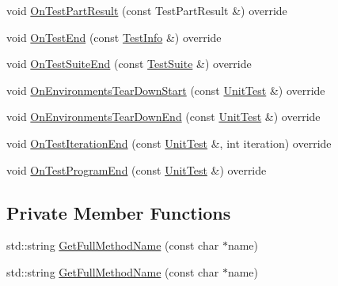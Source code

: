 \begin{DoxyCompactItemize}
\item 
void \mbox{\hyperlink{classtesting_1_1internal_1_1_event_recording_listener2_a0c7bd2ef9f0e467b408dcb4c984cb3fc}{On\+Test\+Part\+Result}} (const Test\+Part\+Result \&) override
\item 
void \mbox{\hyperlink{classtesting_1_1internal_1_1_event_recording_listener2_a8651cee935f60407bd65d0162a6d9629}{On\+Test\+End}} (const \mbox{\hyperlink{classtesting_1_1_test_info}{Test\+Info}} \&) override
\item 
void \mbox{\hyperlink{classtesting_1_1internal_1_1_event_recording_listener2_aefd67a80de94cdd8e2e43c0fad812bd2}{On\+Test\+Suite\+End}} (const \mbox{\hyperlink{classtesting_1_1_test_suite}{Test\+Suite}} \&) override
\item 
void \mbox{\hyperlink{classtesting_1_1internal_1_1_event_recording_listener2_a9b29ac6408f671e6b0fcafba75238573}{On\+Environments\+Tear\+Down\+Start}} (const \mbox{\hyperlink{classtesting_1_1_unit_test}{Unit\+Test}} \&) override
\item 
void \mbox{\hyperlink{classtesting_1_1internal_1_1_event_recording_listener2_ac0c920b1264e59dfa7e8c9d159a77e8b}{On\+Environments\+Tear\+Down\+End}} (const \mbox{\hyperlink{classtesting_1_1_unit_test}{Unit\+Test}} \&) override
\item 
void \mbox{\hyperlink{classtesting_1_1internal_1_1_event_recording_listener2_ae93c576efaf6f6d3afc455d05aa9eda8}{On\+Test\+Iteration\+End}} (const \mbox{\hyperlink{classtesting_1_1_unit_test}{Unit\+Test}} \&, int iteration) override
\item 
void \mbox{\hyperlink{classtesting_1_1internal_1_1_event_recording_listener2_a95aeef757bba790c159b5a422030a86b}{On\+Test\+Program\+End}} (const \mbox{\hyperlink{classtesting_1_1_unit_test}{Unit\+Test}} \&) override
\end{DoxyCompactItemize}
\subsection*{Private Member Functions}
\begin{DoxyCompactItemize}
\item 
std\+::string \mbox{\hyperlink{classtesting_1_1internal_1_1_event_recording_listener2_afa16bea3294a90f99593eb65b15c74ff}{Get\+Full\+Method\+Name}} (const char $\ast$name)
\item 
std\+::string \mbox{\hyperlink{classtesting_1_1internal_1_1_event_recording_listener2_afa16bea3294a90f99593eb65b15c74ff}{Get\+Full\+Method\+Name}} (const char $\ast$name)
\end{DoxyCompactItemize}
